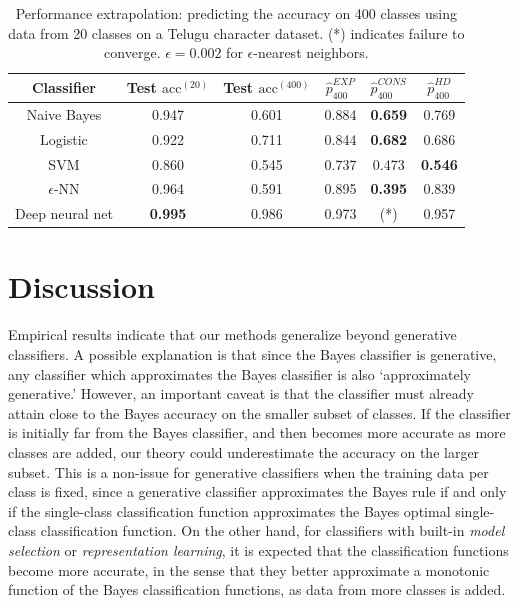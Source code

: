 \documentclass{article}
\begin{document}
\begin{table}
\centering
\begin{tabular}{|c||c|c|c|c|c|}\hline
Classifier & Test $\text{acc}^{(20)}$ & Test $\text{acc}^{(400)}$ & $\hat{p}^{EXP}_{400}$ & $\hat{p}^{CONS}_{400}$ & $\hat{p}^{HD}_{400}$\\ \hline
Naive Bayes & 0.947 & 0.601 & 0.884 & \textbf{0.659} & 0.769 \\ \hline
Logistic & 0.922 & 0.711 & 0.844 & \textbf{0.682} & 0.686 \\ \hline
SVM & 0.860 & 0.545 & 0.737 & 0.473 & \textbf{0.546} \\ \hline
$\epsilon$-NN & 0.964 & 0.591 & 0.895 & \textbf{0.395} & 0.839\\ \hline
Deep neural net & \textbf{0.995} & 0.986 & 0.973 & (*) & 0.957\\ \hline
\end{tabular}
\caption{Performance extrapolation: predicting the accuracy on 400 classes using data from 20 classes on a Telugu character dataset. (*) indicates failure to converge.
$\epsilon = 0.002$ for $\epsilon$-nearest neighbors.}
\end{table}

\section{Discussion}

Empirical results indicate that our methods generalize beyond generative classifiers.
A possible explanation is that since the Bayes classifier is generative,
any classifier which approximates the Bayes classifier is also `approximately generative.'
However, an important caveat is that the classifier must already attain close to the Bayes accuracy
on the smaller subset of classes.  If the classifier is initially far from the Bayes classifier,
and then becomes more accurate as more classes are added, our theory could underestimate the
accuracy on the larger subset.  This is a non-issue for generative classifiers when the training data per class is fixed,
since a generative classifier approximates the Bayes rule if and only if the single-class classification function approximates the
Bayes optimal single-class classification function.  On the other hand, for classifiers with built-in \emph{model selection}
or \emph{representation learning}, it is expected that the classification functions become more accurate,
in the sense that they better approximate a monotonic function of the Bayes classification functions,
as data from more classes is added.
\end{document}
